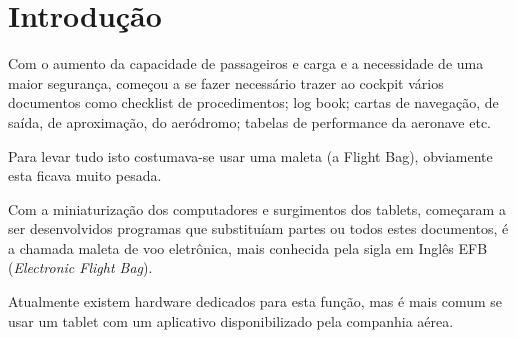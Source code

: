 \chapter{Introdução}
Com o aumento da capacidade de passageiros e carga e a 
necessidade de uma maior 
segurança, começou a se fazer necessário trazer ao cockpit vários
documentos como checklist de procedimentos; log book; cartas de 
navegação, de saída, de aproximação, do aeródromo; tabelas de 
performance da aeronave etc. 

Para levar tudo isto costumava-se usar uma maleta (a Flight Bag),
obviamente esta ficava muito pesada.

Com a miniaturização dos computadores e surgimentos dos tablets, 
começaram a ser desenvolvidos programas que substituíam partes
ou todos estes documentos, é a chamada maleta de voo eletrônica,
mais conhecida pela sigla em Inglês EFB (\textit{Electronic Flight Bag}).

Atualmente existem hardware dedicados para esta função, mas é
mais comum se usar um tablet com um aplicativo disponibilizado pela
companhia aérea.